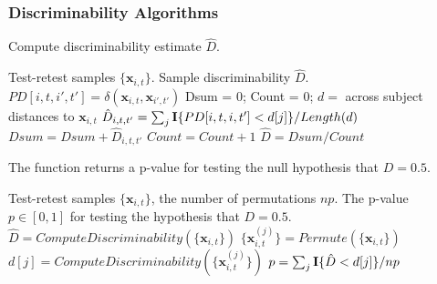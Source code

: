 \documentclass[simplex.tex]{subfiles}
\providecommand{\mb}[1]{\boldsymbol{#1}}
\newcommand{\bx}{\mb{x}}
\begin{document}
\clearpage

\subsubsection*{Discriminability Algorithms}
\begin{algorithm}               
	\caption{Compute discriminability estimate $\hat{D}$.  }   
	\label{alg:dhat}                       
	\begin{algorithmic}                    
		\Require Test-retest samples $\{\bx_{i,t}\}$.
		\Ensure Sample discriminability $\hat{D}$. 
		 
		\State $PD[i,t,i',t'] = \delta(\bx_{i,t},\bx_{i',t'})$
		\EndFor
		\State Dsum = 0;
		\State Count = 0;
		\State $d =$ across subject distances to $\bx_{i,t}$
		\State $\hat{D}_{i,t,t'} =\sum_j {\bf I}\{PD[i,t,i,t'] < d[j]\}/Length(d)$ 
		\State $Dsum = Dsum + \hat{D}_{i,t,t'}$
		\State $Count = Count + 1$
		\EndFor	
		\EndFor
		\EndFor
		\State $\hat{D} = Dsum / Count$ 
		\EndFunction
	\end{algorithmic}
\end{algorithm}

\begin{algorithm}               
	\caption{The function returns a p-value for testing the null hypothesis that $D = 0.5$.  }   
	\label{alg:ost}                       
	\begin{algorithmic}                    
		\Require Test-retest samples $\{\bx_{i,t}\}$, the number of permutations $np$.
		\Ensure The p-value $p \in [0,1]$ for testing the hypothesis that $D = 0.5$. 
		\State $\hat{D}= ComputeDiscriminability(\{\bx_{i,t}\})$ 
		\State $\{\bx^{(j)}_{i,t}\} = Permute(\{\bx_{i,t}\})$ 
		\State $d[j] = ComputeDiscriminability(\{\bx^{(j)}_{i,t}\})$ 
		\EndFor
		\State $p = \sum_j {\bf I}\{\hat{D} < d[j]\} / np$ 
		\EndFunction
	\end{algorithmic}
\end{algorithm}
\end{document}
